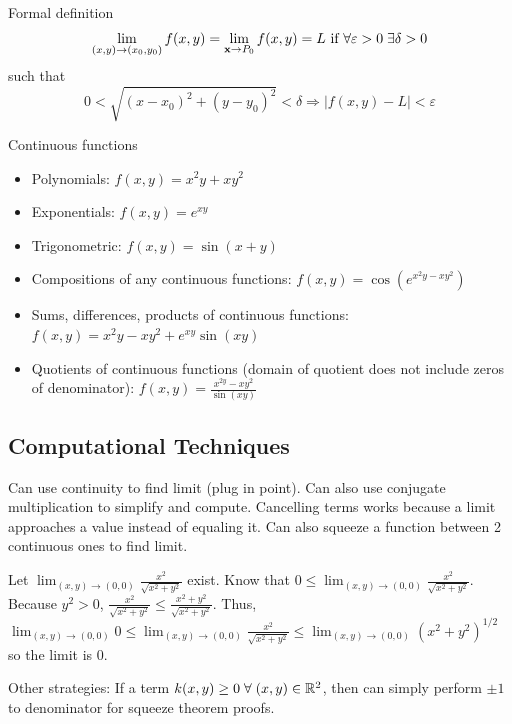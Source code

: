 \begin{mybox}{Formal definition}
\[\lim _{(x, y) \rightarrow\left(x_{0}, y_{0}\right)} f(x, y)=\lim _{\textbf{x} \rightarrow P_{0}} f(x, y)=L \text { if } \forall \varepsilon>0 \;\exists \delta>0\]
such that
\[0<\sqrt{\left(x-x_{0}\right)^{2}+\left(y-y_{0}\right)^{2}}<\delta \Longrightarrow|f(x, y)-L|<\varepsilon\]
\end{mybox}

\begin{mybox}{Continuous functions}
    \begin{itemize}
        \item Polynomials: $f(x,y)=x^2y+xy^2$
        \item Exponentials: $f(x,y)=e^{xy}$
        \item Trigonometric: $f(x,y)=\sin(x+y)$
        \item Compositions of any continuous functions: $f(x,y)=\cos(e^{x^2y-xy^2})$
        \item Sums, differences, products of continuous functions: $f(x, y)=x^{2} y-x y^{2}+e^{x y} \sin (x y)$
        \item Quotients of continuous functions (domain of quotient does not include zeros of denominator): $f(x, y)=\frac{x^{2 y}-x y^{2}}{\sin (x y)}$
    \end{itemize}
\end{mybox}

\subsection{Computational Techniques}

Can use continuity to find limit (plug in point). Can also use conjugate multiplication to simplify and compute. Cancelling terms works because a limit approaches a value instead of equaling it.
Can also squeeze a function between 2 continuous ones to find limit.

Let $\lim _{(x, y) \rightarrow(0,0)} \frac{x^{2}}{\sqrt{x^{2}+y^{2}}}$ exist.
Know that $0\leq \lim _{(x, y) \rightarrow(0,0)} \frac{x^{2}}{\sqrt{x^{2}+y^{2}}}$.
Because $y^2>0$, $\frac{x^{2}}{\sqrt{x^{2}+y^{2}}} \leq \frac{x^{2}+y^{2}}{\sqrt{x^{2}+y^{2}}}$.
Thus, $\lim _{(x, y) \rightarrow(0,0)} 0 \leq \lim _{(x, y) \rightarrow(0,0)} \frac{x^{2}}{\sqrt{x^{2}+y^{2}}} \leq \lim _{(x, y) \rightarrow(0,0)}\left(x^{2}+y^{2}\right)^{1 / 2}$
so the limit is 0.

Other strategies: If a term $k(x,y)\geq 0\;\forall\; (x,y)\in \mathbb{R}^2$, then can simply perform $\pm 1$ to denominator for squeeze theorem proofs.

